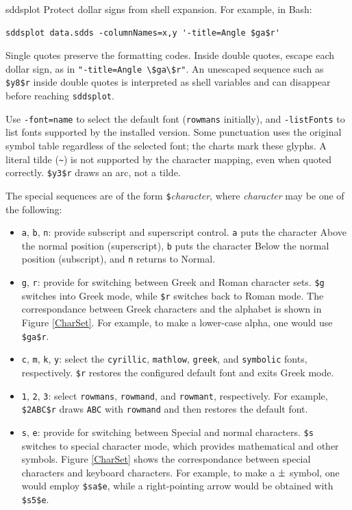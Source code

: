\begin{sddsprog}{sddsplot}
Protect dollar signs from shell expansion. For example, in Bash:
\begin{verbatim}
sddsplot data.sdds -columnNames=x,y '-title=Angle $ga$r'
\end{verbatim}
Single quotes preserve the formatting codes. Inside double quotes, escape each
dollar sign, as in \verb|"-title=Angle \$ga\$r"|. An unescaped sequence such as
\verb|$y8$r| inside double quotes is interpreted as shell variables and can
disappear before reaching \verb|sddsplot|.

Use \verb|-font=name| to select the default font (\verb|rowmans| initially),
and \verb|-listFonts| to list fonts supported by the installed version.
Some punctuation uses the original symbol table regardless of the selected
font; the charts mark these glyphs. A literal tilde (\verb|~|) is not supported
by the character mapping, even when quoted correctly. \verb|$y3$r| draws an
arc, not a tilde.

The special sequences are of the form \verb|$|{\em character}, where {\em character} may be one of the following:
\begin{itemize}

\item {\tt a}, {\tt b}, {\tt n}: provide subscript and superscript control.  {\tt a} puts the character Above the
normal position (superscript), {\tt b} puts the character Below the normal position (subscript), and {\tt n}
returns to Normal.

\item {\tt g}, {\tt r}: provide for switching between Greek and Roman
character sets. \verb|$g| switches into Greek mode, while \verb|$r|
switches back to Roman mode.  The correspondance between Greek
characters and the alphabet is shown in Figure \ref{CharSet}.  For
example, to make a lower-case alpha, one would use \verb|$ga$r|.

\item {\tt c}, {\tt m}, {\tt k}, {\tt y}: select the \verb|cyrillic|,
\verb|mathlow|, \verb|greek|, and \verb|symbolic| fonts, respectively.
\verb|$r| restores the configured default font and exits Greek mode.

\item {\tt 1}, {\tt 2}, {\tt 3}: select \verb|rowmans|, \verb|rowmand|,
and \verb|rowmant|, respectively. For example, \verb|$2ABC$r| draws
\verb|ABC| with \verb|rowmand| and then restores the default font.

\item {\tt s}, {\tt e}: provide for switching between Special and
normal characters.  \verb|$s| switches to special character mode,
which provides mathematical and other symbols.  Figure \ref{CharSet}
shows the correspondance between special characters and keyboard
characters.  For example, to make a ${\rm \pm}$ symbol, one would
employ \verb|$sa$e|, while a right-pointing arrow would be obtained
with \verb|$s5$e|.


\end{itemize}
\end{sddsprog}
